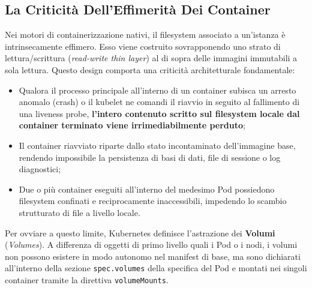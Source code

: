 \documentclass[11pt, a4paper]{article}
\begin{document}
\subsection{La Criticità Dell'Effimerità Dei Container}
Nei motori di containerizzazione nativi, il filesystem associato a un'istanza è intrinsecamente effimero. Esso viene costruito sovrapponendo uno strato di lettura/scrittura (\emph{read-write thin layer}) al di sopra delle immagini immutabili a sola lettura. Questo design comporta una criticità architetturale fondamentale:
\begin{itemize}[noitemsep]
    \item Qualora il processo principale all'interno di un container subisca un arresto anomalo (crash) o il kubelet ne comandi il riavvio in seguito al fallimento di una liveness probe, \textbf{l'intero contenuto scritto sul filesystem locale dal container terminato viene irrimediabilmente perduto};
    \item Il container riavviato riparte dallo stato incontaminato dell'immagine base, rendendo impossibile la persistenza di basi di dati, file di sessione o log diagnostici;
    \item Due o più container eseguiti all'interno del medesimo Pod possiedono filesystem confinati e reciprocamente inaccessibili, impedendo lo scambio strutturato di file a livello locale.
\end{itemize}

Per ovviare a questo limite, Kubernetes definisce l'astrazione dei \textbf{Volumi} (\emph{Volumes}). A differenza di oggetti di primo livello quali i Pod o i nodi, i volumi non possono esistere in modo autonomo nel manifest di base, ma sono dichiarati all'interno della sezione \texttt{spec.volumes} della specifica del Pod e montati nei singoli container tramite la direttiva \texttt{volumeMounts}.
\end{document}
